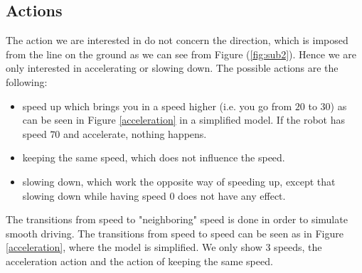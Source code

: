 \documentclass[14pt,a4paper]{article}
\theoremstyle{definition}
\begin{document}
\subsection{Actions}
The action we are interested in do not concern the direction, which is imposed from the line on the ground as we can see from Figure (\ref{fig:sub2}). Hence we are only interested in accelerating or slowing down. The possible actions are the following:
\begin{itemize}
\item speed up which brings you in a speed higher (i.e. you go from $20$ to $30$) as can be seen in Figure \ref{acceleration} in a simplified model. If the robot has speed $70$ and accelerate, nothing happens.
\item keeping the same speed, which does not influence the speed.
\item slowing down, which work the opposite way of speeding up, except that slowing down while having speed $0$ does not have any effect.
\end{itemize}
The transitions from speed to "neighboring" speed is done in order to simulate smooth driving.
 The transitions from speed to speed can be seen as in Figure \ref{acceleration}, where the model is simplified. We only show 3 speeds, the acceleration action and the action of keeping the same speed.
\end{document}
